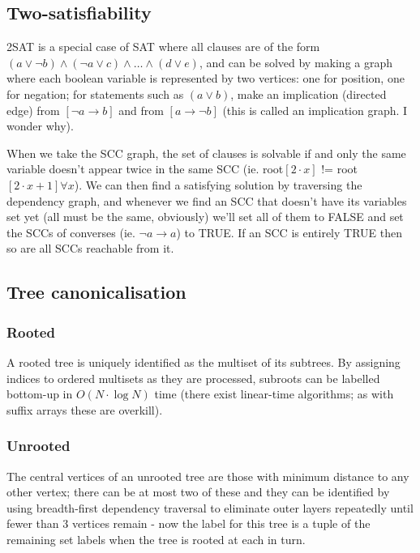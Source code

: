   \subsection {Two-satisfiability}
    2SAT is a special case of SAT where all clauses are of the form
    $(a \lor \neg b) \land (\neg a \lor c) \land \dots \land (d \lor e)$,
    and can be solved by making a graph where each boolean variable is represented by two vertices:
    one for position, one for negation; for statements such as $(a \lor b)$, make an implication
    (directed edge) from $[\neg a \rightarrow b]$ and from $[a \rightarrow \neg b]$ (this is called
    an implication graph. I wonder why).

    When we take the SCC graph, the set of clauses is solvable if and only the same variable
    doesn't appear twice in the same SCC (ie. root$[2 \cdot x]$ != root$[2 \cdot x + 1] \forall x$).
    We can then find a satisfying solution by traversing the dependency graph, and whenever we find an
    SCC that doesn't have its variables set yet (all must be the same, obviously) we'll set all of
    them to FALSE and set the SCCs of converses (ie. $\neg a \rightarrow a$) to TRUE. If an SCC is entirely
    TRUE then so are all SCCs reachable from it.

  \subsection {Tree canonicalisation}
    \subsubsection {Rooted}
      A rooted tree is uniquely identified as the multiset of its subtrees. By assigning indices to ordered multisets as they are processed, subroots can be
      labelled bottom-up in $ O(N \cdot \log{N}) $ time (there exist linear-time algorithms; as with suffix arrays these are overkill).

    \subsubsection {Unrooted}
      The central vertices of an unrooted tree are those with minimum distance to any other vertex; there can be at most two of these and they can be identified by
      using breadth-first dependency traversal to eliminate outer layers repeatedly until fewer than 3 vertices remain - now the label for this tree is a tuple of the
      remaining set labels when the tree is rooted at each in turn.

